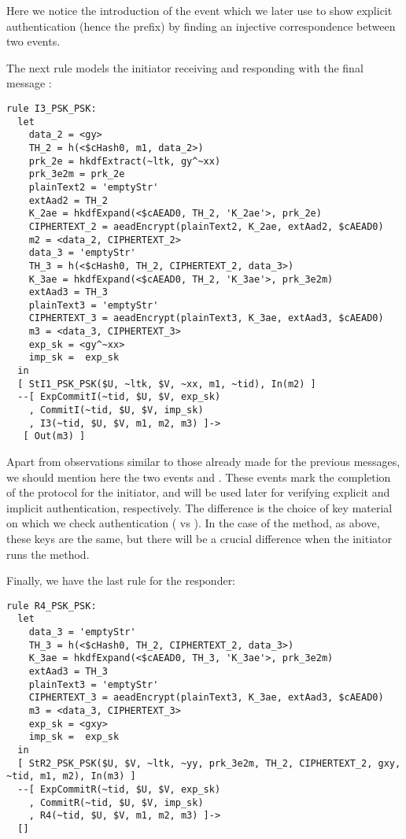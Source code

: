 Here we notice the introduction of the event 
% 
which we later use to show explicit authentication (hence the  prefix) by
finding an injective correspondence between two events.

The next rule models the initiator receiving  and responding with the
final message :
\begin{lstlisting}
rule I3_PSK_PSK:
  let
    data_2 = <gy> 
    TH_2 = h(<$cHash0, m1, data_2>)
    prk_2e = hkdfExtract(~ltk, gy^~xx)
    prk_3e2m = prk_2e
    plainText2 = 'emptyStr' 
    extAad2 = TH_2
    K_2ae = hkdfExpand(<$cAEAD0, TH_2, 'K_2ae'>, prk_2e)
    CIPHERTEXT_2 = aeadEncrypt(plainText2, K_2ae, extAad2, $cAEAD0)
    m2 = <data_2, CIPHERTEXT_2>
    data_3 = 'emptyStr' 
    TH_3 = h(<$cHash0, TH_2, CIPHERTEXT_2, data_3>)
    K_3ae = hkdfExpand(<$cAEAD0, TH_2, 'K_3ae'>, prk_3e2m)
    extAad3 = TH_3
    plainText3 = 'emptyStr'
    CIPHERTEXT_3 = aeadEncrypt(plainText3, K_3ae, extAad3, $cAEAD0)
    m3 = <data_3, CIPHERTEXT_3>
    exp_sk = <gy^~xx>
    imp_sk =  exp_sk
  in
  [ StI1_PSK_PSK($U, ~ltk, $V, ~xx, m1, ~tid), In(m2) ]
  --[ ExpCommitI(~tid, $U, $V, exp_sk)
    , CommitI(~tid, $U, $V, imp_sk)
    , I3(~tid, $U, $V, m1, m2, m3) ]->
   [ Out(m3) ]
\end{lstlisting}

Apart from observations similar to those already made for the previous messages,
we should mention here the two events %
 and . %
These events mark the completion of the protocol for the initiator, and will
be used later for verifying explicit and implicit authentication, respectively.
The difference is the choice of key material on which we check authentication
( vs ). In the case of the \mSig{} method, as above, these
keys are the same, but there will be a crucial difference when the initiator runs the \mStat{} method.

Finally, we have the last rule for the responder:
\begin{lstlisting}
rule R4_PSK_PSK:
  let
    data_3 = 'emptyStr' 
    TH_3 = h(<$cHash0, TH_2, CIPHERTEXT_2, data_3>)
    K_3ae = hkdfExpand(<$cAEAD0, TH_3, 'K_3ae'>, prk_3e2m)
    extAad3 = TH_3
    plainText3 = 'emptyStr'
    CIPHERTEXT_3 = aeadEncrypt(plainText3, K_3ae, extAad3, $cAEAD0)
    m3 = <data_3, CIPHERTEXT_3>
    exp_sk = <gxy>
    imp_sk =  exp_sk
  in
  [ StR2_PSK_PSK($U, $V, ~ltk, ~yy, prk_3e2m, TH_2, CIPHERTEXT_2, gxy, ~tid, m1, m2), In(m3) ]
  --[ ExpCommitR(~tid, $U, $V, exp_sk)
    , CommitR(~tid, $U, $V, imp_sk)
    , R4(~tid, $U, $V, m1, m2, m3) ]->
  []
\end{lstlisting}

